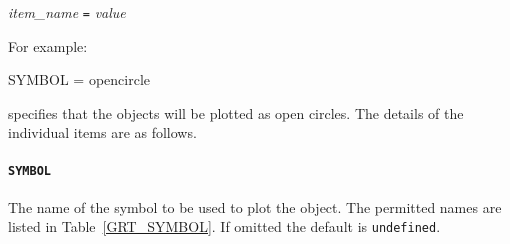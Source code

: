 \documentclass[twoside,11pt]{starlink}
\begin{document}
\begin{center}
\textit{item\_name} \texttt{=} \textit{value}
\end{center}

For example:

\begin{terminalv}
SYMBOL = opencircle
\end{terminalv}

specifies that the objects will be plotted as open circles.  The details of
the individual items are as follows.

\paragraph{\texttt{SYMBOL}} The name of the symbol to be used to plot
the object.  The permitted names are listed in Table~\ref{GRT_SYMBOL}.
If omitted the default is \texttt{undefined}.
\end{document}
